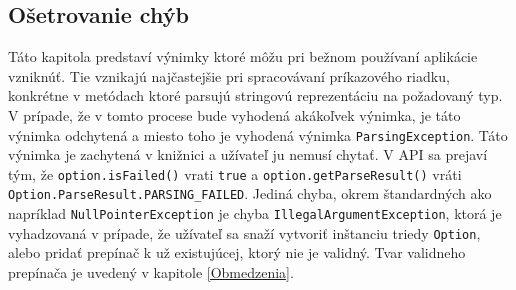\documentclass{article}
\begin{document}
\subsection{Ošetrovanie chýb}
Táto kapitola predstaví výnimky ktoré môžu pri bežnom používaní aplikácie vzniknúť. Tie vznikajú najčastejšie pri spracovávaní príkazového riadku, konkrétne v metódach ktoré parsujú stringovú reprezentáciu na požadovaný typ. V prípade, že v tomto procese bude vyhodená akákoľvek výnimka, je táto výnimka odchytená a miesto toho je vyhodená výnimka \texttt{ParsingException}. Táto výnimka je zachytená v knižnici a užívateľ ju nemusí chytať. V API sa prejaví tým, že \texttt{option.isFailed()} vrati \texttt{true} a \texttt{option.getParseResult()} vráti \\\texttt{Option.ParseResult.PARSING\_FAILED}.
Jediná chyba, okrem štandardných ako napríklad \texttt{NullPointerException} je chyba \texttt{IllegalArgumentException}, ktorá je vyhadzovaná v prípade, že užívateľ sa snaží vytvoriť inštanciu triedy \texttt{Option}, alebo pridať prepínač k už existujúcej, ktorý nie je validný. Tvar validneho prepínača je uvedený v kapitole \ref{Obmedzenia}. 
\end{document}
